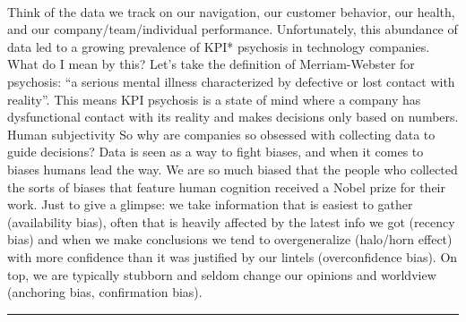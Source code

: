\documentclass[10pt,a4paper]{article}
\begin{document}
\begin{multicols*}{2}
\paragraph{}
 Think of the data we track on our navigation, our customer behavior, our health, and our company/team/individual performance. Unfortunately, this abundance of data led to a growing prevalence of KPI* psychosis in technology companies.
What do I mean by this? Let’s take the definition of Merriam-Webster for psychosis: “a serious mental illness characterized by defective or lost contact with reality”. This means KPI psychosis is a state of mind where a company has dysfunctional contact with its reality and makes decisions only based on numbers.
Human subjectivity
So why are companies so obsessed with collecting data to guide decisions? Data is seen as a way to fight biases, and when it comes to biases humans lead the way. We are so much biased that the people who collected the sorts of biases that feature human cognition received a Nobel prize for their work.
Just to give a glimpse: we take information that is easiest to gather (availability bias), often that is heavily affected by the latest info we got (recency bias) and when we make conclusions we tend to overgeneralize (halo/horn effect) with more confidence than it was justified by our lintels (overconfidence bias). On top, we are typically stubborn and seldom change our opinions and worldview (anchoring bias, confirmation bias).
\par\noindent\textcolor{red}{\rule{\linewidth}{0.2mm}}
\vfill
\null
\noindent\begin{minipage}{\linewidth}

\end{minipage}
\end{multicols*}
\end{document}

